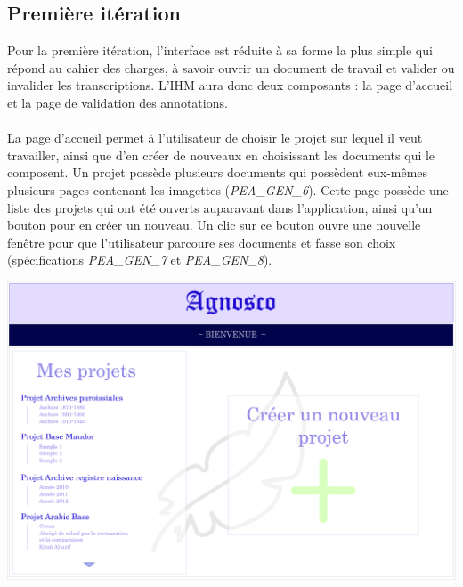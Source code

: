 \subsection{Première itération}

Pour la première itération, l’interface est réduite à sa forme la plus simple qui répond au cahier des charges, à savoir ouvrir un document de travail et valider ou invalider les transcriptions. L’IHM aura donc deux composants : la page d’accueil et la page de validation des annotations.

\paragraph{}
La page d’accueil permet à l’utilisateur de choisir le projet sur lequel il veut travailler, ainsi que d'en créer de nouveaux en choisissant les documents qui le composent. Un projet possède plusieurs documents qui possèdent eux-mêmes plusieurs pages contenant les imagettes (\textit{PEA\_GEN\_6}). Cette page possède une liste des projets qui ont été ouverts auparavant dans l’application, ainsi qu’un bouton pour en créer un nouveau. Un clic sur ce bouton ouvre une nouvelle fenêtre pour que l’utilisateur parcoure ses documents et fasse son choix (spécifications \textit{PEA\_GEN\_7} et \textit{PEA\_GEN\_8}).

\newpage{}
\begin{mdframed}[frametitle={Figure 1 : Maquette de la page d'accueil de l'IHM}, innerbottommargin=10]
\begin{center}
\includegraphics[scale=0.04]{assets/maquetteIHMaccueil.jpg}
\end{center}
\end{mdframed}

